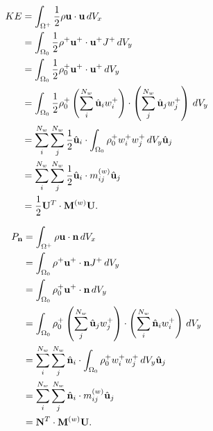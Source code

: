 \documentclass[11pt]{report}
\begin{document}
\begin{align}
    KE &= \int_{\Omega^+} \frac{1}{2} \rho \mathbf{u} \cdot \mathbf{u} \, dV_x \nonumber \\
    &= \int_{\Omega_0} \frac{1}{2} \rho^+ \mathbf{u}^+ \cdot \mathbf{u}^+ J^+ \, dV_y \nonumber \\
    &= \int_{\Omega_0} \frac{1}{2} \rho_0^+ \mathbf{u}^+ \cdot \mathbf{u}^+ \, dV_y \nonumber \\
    &= \int_{\Omega_0} \frac{1}{2} \rho_0^+ \left ( \sum_i^{N_w} \hat{\mathbf{u}}_i w_i^+ \right ) \cdot \left ( \sum_j^{N_w} \hat{\mathbf{u}}_j w_j^+ \right ) \, dV_y \nonumber \\
    &= \sum_i^{N_w} \sum_j^{N_w} \frac{1}{2} \hat{\mathbf{u}}_i \cdot \int_{\Omega_0}\rho_0^+ w_i^+ w_j^+ \, dV_y \hat{\mathbf{u}}_j \nonumber \\
    &= \sum_i^{N_w} \sum_j^{N_w} \frac{1}{2} \hat{\mathbf{u}}_i \cdot m_{ij}^{(w)} \hat{\mathbf{u}}_j \nonumber \\
    &= \frac{1}{2} \mathbf{U}^T \cdot \mathbf{M}^{(w)} \mathbf{U}.
\end{align}

\begin{align}
    P_{\mathbf{n}} &= \int_{\Omega^+} \rho \mathbf{u} \cdot \mathbf{n} \, dV_x \nonumber \\
    &= \int_{\Omega_0} \rho^+ \mathbf{u}^+ \cdot \mathbf{n} J^+ \, dV_y \nonumber \\
    &= \int_{\Omega_0} \rho^+_0 \mathbf{u}^+ \cdot \mathbf{n} \, dV_y \nonumber \\
    &= \int_{\Omega_0} \rho^+_0 \left ( \sum_j^{N_w} \hat{\mathbf{u}}_j w^+_j \right ) \cdot \left ( \sum_i^{N_w} \hat{\mathbf{n}}_i w_i^+ \right ) \, dV_y \nonumber \\
    &= \sum_i^{N_w} \sum_j^{N_w} \hat{\mathbf{n}}_i \cdot \int_{\Omega_0} \rho_0^+ w_i^+ w_j^+ \, dV_y \hat{\mathbf{u}}_j \nonumber \\
    &= \sum_i^{N_w} \sum_j^{N_w} \hat{\mathbf{n}}_i \cdot m_{ij}^{(w)} \hat{\mathbf{u}}_j \nonumber \\
    &= \mathbf{N}^T \cdot \mathbf{M}^{(w)} \mathbf{U}.
\end{align}
\end{document}
